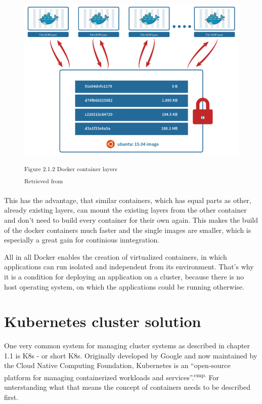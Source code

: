 \begin{figure}[h]
\centering
\includegraphics[width=\textwidth/5*3]{images/docker_layer.png}

\textsuperscript{Figure 2.1.2 Docker container layers}\\
\textsuperscript{Retrieved from \cite{}}
\end{figure}

This has the advantage, that similar containers, which has equal parts as other, already existing layers, can mount the existing layers from the other container and don't need to build every container for their own again. This makes the build of the docker containers much faster and the single images are smaller, which is especially a great gain for continious inntegration.


All in all Docker enables the creation of virtualized containers, in which applications can run isolated and independent from its environment. That's why it is a condition for deploying an application on a cluster, because there is no host operating system, on which the applications could be running otherwise.


\section{Kubernetes cluster solution}

One very common system for managing cluster systems as described in chapter 1.1 is \acl{K8s} - or short \acs{K8s}. Originally developed by Google and now maintained by the Cloud Native Computing Foundation, Kubernetes is an ``open-source platform for managing containerized workloads and services''.\textsuperscript{cmp.\cite{12}} For unterstanding what that means the concept of containers needs to be described first.

